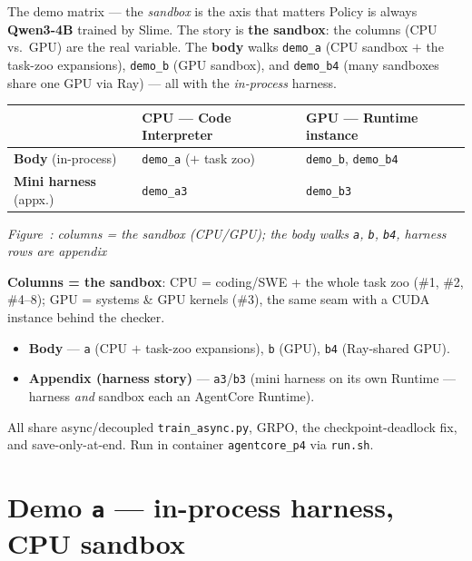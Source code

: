 \documentclass[aspectratio=169]{beamer}
\newcounter{deckfig}
\newcommand{\figtag}[1]{\refstepcounter{deckfig}%
  {\scriptsize\itshape Figure~\thedeckfig: #1}}
\begin{document}
\begin{frame}{The demo matrix --- the \emph{sandbox} is the axis that matters}
  \footnotesize Policy is always \textbf{Qwen3-4B} trained by Slime. The story is \textbf{the sandbox}:
  the columns (CPU vs.\ GPU) are the real variable. The \textbf{body} walks \texttt{demo\_a}
  (CPU sandbox $+$ the task-zoo expansions), \texttt{demo\_b} (GPU sandbox), and \texttt{demo\_b4}
  (many sandboxes share one GPU via Ray) --- all with the \emph{in-process} harness.
  \begin{table}\centering
    \renewcommand{\arraystretch}{1.1}\footnotesize
    \begin{tabular}{lll}
      \toprule
       & \textbf{CPU --- Code Interpreter} & \textbf{GPU --- Runtime instance} \\
      \midrule
      \textbf{Body} (in-process)    & \alert{\texttt{demo\_a}} ($+$ task zoo)  & \alert{\texttt{demo\_b}}, \alert{\texttt{demo\_b4}} \\
      \textbf{Mini harness} (appx.)  & \texttt{demo\_a3} & \texttt{demo\_b3} \\
      \bottomrule
    \end{tabular}
  \end{table}
  \vspace{-0.3em}
  \begin{center}\figtag{columns = the sandbox (CPU/GPU); the body walks \texttt{a}, \texttt{b}, \texttt{b4}, harness rows are appendix}\end{center}
  {\footnotesize\textbf{Columns = the sandbox}: CPU = coding/SWE + the whole task zoo (\#1, \#2, \#4--8);
  GPU = systems \& GPU kernels (\#3), the same seam with a CUDA instance behind the checker.}
  \begin{itemize}\setlength\itemsep{0.03em}
    \item \textbf{Body} --- \texttt{a} (CPU $+$ task-zoo expansions), \texttt{b} (GPU), \texttt{b4} (Ray-shared GPU).
    \item \textbf{Appendix (harness story)} --- \texttt{a3}/\texttt{b3} (mini harness on its own Runtime --- harness \emph{and} sandbox each an AgentCore Runtime).
  \end{itemize}
  {\footnotesize All share async/decoupled \texttt{train\_async.py}, GRPO, the checkpoint-deadlock
  fix, and save-only-at-end. Run in container \texttt{agentcore\_p4} via \texttt{run.sh}.}
\end{frame}

\section{Demo \texttt{a} --- in-process harness, CPU sandbox}
\end{document}
